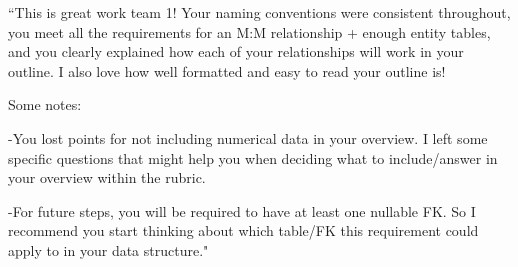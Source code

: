 \documentclass{article}
\begin{document}
\vspace{0.5cm}



\begin{tcolorbox}[colback=secondarycolor, colframe=primarycolor, title=\textbf{Step 1: TA Review - Madelyn Lazar}]
``This is great work team 1! Your naming conventions were consistent throughout, you meet all the requirements for an M:M relationship + enough entity tables, and you clearly explained how each of your relationships will work in your outline. I also love how well formatted and easy to read your outline is!

\vspace{0.2cm}

Some notes:

\vspace{0.2cm}

-You lost points for not including numerical data in your overview. I left some specific questions that might help you when deciding what to include/answer in your overview within the rubric.

\vspace{0.2cm}

-For future steps, you will be required to have at least one nullable FK. So I recommend you start thinking about which table/FK this requirement could apply to in your data structure."

\vspace{0.2cm}
\end{tcolorbox}

\vspace{0.5cm}
\end{document}

